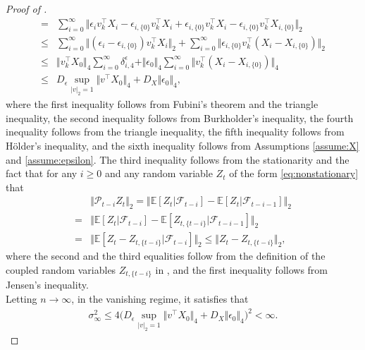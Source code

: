 \documentclass[11pt]{article}
\theoremstyle{plain}
\theoremstyle{definition}
\begin{document}
\begin{proof}[Proof of ]
\begin{align}
        =& \sum_{i = 0}^{\infty}\big\Vert \epsilon_iv_k^{\top}X_i - \epsilon_{i,\{0\}}v_k^{\top}X_i + \epsilon_{i,\{0\}}v_k^{\top}X_{i} -\epsilon_{i,\{0\}}v_k^{\top}X_{i,\{0\}} \big\Vert_{2} \nonumber\\
        \leq& \sum_{i = 0}^{\infty}\big\Vert (\epsilon_i-\epsilon_{i,\{0\}})v_k^{\top}X_i\big\Vert_2 + \sum_{i = 0}^{\infty}\big\Vert \epsilon_{i,\{0\}}v_k^{\top}(X_i - X_{i,\{0\}}) \big\Vert_{2} \nonumber\\
        \leq& \big\Vert v_k^{\top} X_0 \big\Vert_4\sum_{i = 0}^{\infty}\delta_{i,4}^{\epsilon} + \Vert \epsilon_0 \Vert_4\sum_{i = 0}^{\infty}\big\Vert v_k^{\top} (X_i - X_{i,\{0\}}) \big\Vert_{4} \nonumber\\
        \leq& D_{\epsilon}\sup_{|v|_2 = 1}\big\Vert v^{\top} X_0 \big\Vert_4 + D_{X}\Vert \epsilon_0 \Vert_4,
    \end{align}
    where the first inequality follows from Fubini's theorem and the triangle inequality, the second inequality follows from Burkholder's inequality, the fourth inequality follows from the triangle inequality, the fifth inequality follows from H\"older's inequality, and the sixth inequality follows from Assumptions \ref{assume:X} and \ref{assume:epsilon}. The third inequality follows from the stationarity and the fact that for any $i \geq 0$ and any random variable $Z_t$ of the form \eqref{eq:nonstationary} that
    \begin{equation*}
    \begin{aligned}
        &\Vert \mathcal{P}_{t-i}Z_t \Vert_2 = \Vert \mathbb{E}[Z_t | \mathcal{F}_{t-i}] -\mathbb{E}[Z_t | \mathcal{F}_{t-i-1}] \Vert_2\\
        =& \Vert\mathbb{E}[Z_t| \mathcal{F}_{t-i}] - \mathbb{E}[Z_{t,\{t-i\}}| \mathcal{F}_{t-i-1}]\Vert_2\\
        =& \Vert\mathbb{E}[Z_t-Z_{t,\{t-i\}}| \mathcal{F}_{t-i}]\Vert_2 \leq \Vert Z_{t}-Z_{t,\{t-i\}}\Vert_2,
    \end{aligned}
    \end{equation*}
    where the second and the third equalities follow from the definition of the coupled random variables $Z_{t,\{t-i\}}$ in , and the first inequality follows from Jensen's inequality.
\
\\
Letting $n \to \infty$, in the vanishing regime, it satisfies that
    \begin{align*}
       \sigma_{\infty}^2 
       \leq 4\bigg(D_{\epsilon}\sup_{|v|_2 = 1}\big\Vert v^{\top} X_0 \big\Vert_4 + D_{X}\Vert \epsilon_0 \Vert_4 \bigg)^2 < \infty.

\end{align*}
\end{proof}
\end{document}
